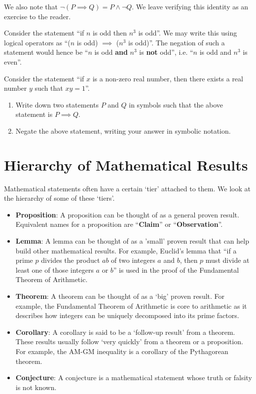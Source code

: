 We also note that $\lnot(P \implies Q) = P \land \lnot Q$. We leave verifying this identity as an exercise to the reader.

\begin{example}
    Consider the statement ``if $n$ is odd then $n^3$ is odd''. We may write this using logical operators as ``($n$ is odd) $\implies$ ($n^3$ is odd)''. The negation of such a statement would hence be ``$n$ is odd \textbf{and} $n^3$ is \textbf{not} odd'', i.e. ``$n$ is odd and $n^3$ is even''.
\end{example}

\begin{exercise}
    Consider the statement ``if $x$ is a non-zero real number, then there exists a real number $y$ such that $xy = 1$''.
    \begin{enumerate}[label=(\roman*)]
        \item Write down two statements $P$ and $Q$ in symbols such that the above statement is $P \implies Q$.
        \item Negate the above statement, writing your answer in symbolic notation.
    \end{enumerate}
\end{exercise}

\section{Hierarchy of Mathematical Results}
Mathematical statements often have a certain `tier' attached to them. We look at the hierarchy of some of these `tiers'.
\begin{itemize}
    \item \textbf{Proposition}: A proposition can be thought of as a general proven result. Equivalent names for a proposition are ``\textbf{Claim}'' or ``\textbf{Observation}''.
    \item \textbf{Lemma}: A lemma can be thought of as a 'small' proven result that can help build other mathematical results. For example, Euclid's lemma that ``if a prime $p$ divides the product $ab$ of two integers $a$ and $b$, then $p$ must divide at least one of those integers $a$ or $b$'' is used in the proof of the Fundamental Theorem of Arithmetic.
    \item \textbf{Theorem}: A theorem can be thought of as a `big' proven result. For example, the Fundamental Theorem of Arithmetic is core to arithmetic as it describes how integers can be uniquely decomposed into its prime factors.
    \item \textbf{Corollary}: A corollary is said to be a `follow-up result' from a theorem. These results usually follow `very quickly' from a theorem or a proposition. For example, the AM-GM inequality is a corollary of the Pythagorean theorem.
    \item \textbf{Conjecture}: A conjecture is a mathematical statement whose truth or falsity is not known.
\end{itemize}

